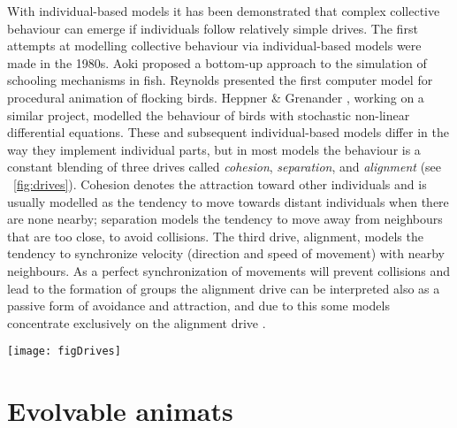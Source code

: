 With individual-based models it has been demonstrated that complex collective behaviour can emerge if individuals follow relatively simple drives. The first attempts at modelling collective behaviour via individual-based models were made in the 1980s. Aoki \cite{aoki1982simulation} proposed a bottom-up approach to the simulation of schooling mechanisms in fish. Reynolds \cite{reynolds1987flocks} presented the first computer model for procedural animation of flocking birds. Heppner \& Grenander \cite{heppner1990stochastic}, working on a similar project, modelled the behaviour of birds with stochastic non-linear differential equations. These and subsequent individual-based models \cite{couzin2002collective,demsar2013family,demsar2014simulated,demsar2015simulating,demsar2016balanced,demsar2017evolution,helbing1995social,hildenbrandt2010selforganized,lebarbajec2009organized,parrish2002schools,schellinck2011review,sumpter2006principles,vicsek2012collective} differ in the way they implement individual parts, but in most models the behaviour is a constant blending of three drives called \emph{cohesion}, \emph{separation}, and \emph{alignment} (see \figurename~\ref{fig:drives}). Cohesion denotes the attraction toward other individuals and is usually modelled as the tendency to move towards distant individuals when there are none nearby; separation models the tendency to move away from neighbours that are too close, to avoid collisions. The third drive, alignment, models the tendency to synchronize velocity (direction and speed of movement) with nearby neighbours. As a perfect synchronization of movements will prevent collisions and lead to the formation of groups the alignment drive can be interpreted also as a passive form of avoidance and attraction, and due to this some models concentrate exclusively on the alignment drive \cite{vicsek1995novel}.

\begin{figure*}
	\texttt{[image: figDrives]}
	\caption{Visualization of the three basic drives: (a) cohesion, (b) separation, and (c) alignment. The black animat is the observed individual. The grey animats are the perceived neighbours that influence the observed animat's behaviour. The white and outlined animats are neighbours that have no direct influence on the observed animat's behaviour.}
	\label{fig:drives}
\end{figure*}

\section{Evolvable animats}

